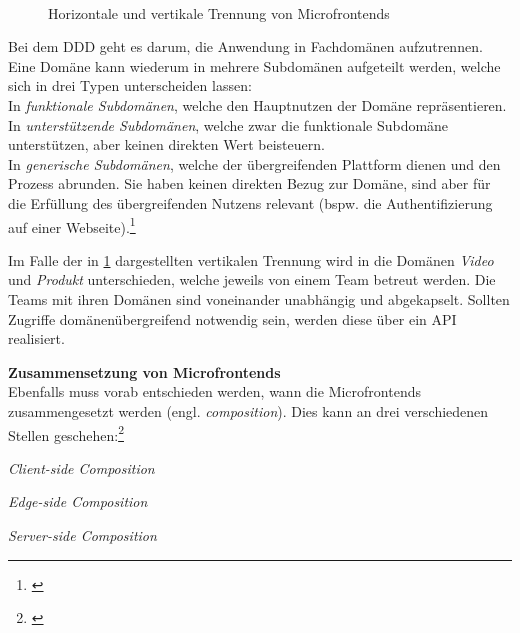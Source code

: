 \begin{figure}[hbt!]
	\begin{minipage}[t]{1\textwidth}	
		\caption{Horizontale und vertikale Trennung von Microfrontends}
		\\ %
		\label{fig:HorizontalVerticalSplit}
	\end{minipage}
\end{figure}

Bei dem \gls{DDD} geht es darum, die Anwendung in Fachdomänen aufzutrennen. Eine Domäne kann wiederum in mehrere Subdomänen aufgeteilt werden, welche sich in drei Typen unterscheiden lassen:\\
In \textit{funktionale Subdomänen}, welche den Hauptnutzen der Domäne repräsentieren. \\
In \textit{unterstützende Subdomänen}, welche zwar die funktionale Subdomäne unterstützen, aber keinen direkten Wert beisteuern.\\
In \textit{generische Subdomänen}, welche der übergreifenden Plattform dienen und den Prozess abrunden. Sie haben keinen direkten Bezug zur Domäne, sind aber für die Erfüllung des übergreifenden Nutzens relevant (bspw. die Authentifizierung auf einer Webseite).\footnote{\cite[vgl.][24\psqq]{Mezzalira2021}} 

Im Falle der in \cref{fig:HorizontalVerticalSplit} dargestellten vertikalen Trennung wird in die Domänen \textit{Video} und \textit{Produkt} unterschieden, welche jeweils von einem Team betreut werden. Die Teams mit ihren Domänen sind voneinander unabhängig und abgekapselt. Sollten Zugriffe domänenübergreifend notwendig sein, werden diese über ein \gls{API} realisiert.

\textbf{Zusammensetzung von Microfrontends}\\
Ebenfalls muss vorab entschieden werden, wann die Microfrontends zusammengesetzt werden (engl. \textit{composition}). Dies kann an drei verschiedenen Stellen geschehen:\footnote{\cite[][29]{Mezzalira2021}}
\begin{compactitem}
	\item \textit{Client-side Composition}
	\item \textit{Edge-side Composition}
	\item \textit{Server-side Composition}
\end{compactitem}

